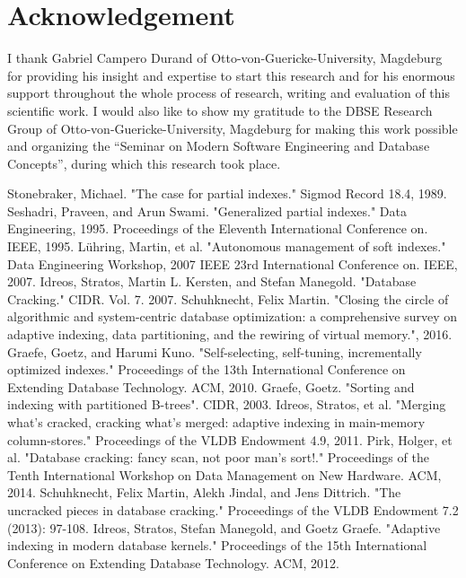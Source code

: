 \documentclass[10pt, conference, compsocconf]{IEEEtran}
\begin{document}
\section*{Acknowledgement}
I thank Gabriel Campero Durand of Otto-von-Guericke-University, Magdeburg for providing his insight and expertise to start this research and for his enormous support throughout the whole process of research, writing and evaluation of this scientific work. I would also like to show my gratitude to the DBSE Research Group of Otto-von-Guericke-University, Magdeburg for making this work possible and organizing the ``Seminar on Modern Software Engineering and Database Concepts'', during which this research took place.

\begin{thebibliography}{8}

Stonebraker, Michael. "The case for partial indexes." Sigmod Record 18.4, 1989.
Seshadri, Praveen, and Arun Swami. "Generalized partial indexes." Data Engineering, 1995. Proceedings of the Eleventh International Conference on. IEEE, 1995.
L\"uhring, Martin, et al. "Autonomous management of soft indexes." Data Engineering Workshop, 2007 IEEE 23rd International Conference on. IEEE, 2007.
Idreos, Stratos, Martin L. Kersten, and Stefan Manegold. "Database Cracking." CIDR. Vol. 7. 2007.
Schuhknecht, Felix Martin. "Closing the circle of algorithmic and system-centric database optimization: a comprehensive survey on adaptive indexing, data partitioning, and the rewiring of virtual memory.", 2016.
Graefe, Goetz, and Harumi Kuno. "Self-selecting, self-tuning, incrementally optimized indexes." Proceedings of the 13th International Conference on Extending Database Technology. ACM, 2010.
Graefe, Goetz. "Sorting and indexing with partitioned B-trees". CIDR, 2003.
Idreos, Stratos, et al. "Merging what's cracked, cracking what's merged: adaptive indexing in main-memory column-stores." Proceedings of the VLDB Endowment 4.9, 2011.
Pirk, Holger, et al. "Database cracking: fancy scan, not poor man's sort!." Proceedings of the Tenth International Workshop on Data Management on New Hardware. ACM, 2014.
Schuhknecht, Felix Martin, Alekh Jindal, and Jens Dittrich. "The uncracked pieces in database cracking." Proceedings of the VLDB Endowment 7.2 (2013): 97-108.
Idreos, Stratos, Stefan Manegold, and Goetz Graefe. "Adaptive indexing in modern database kernels." Proceedings of the 15th International Conference on Extending Database Technology. ACM, 2012.

\end{thebibliography}
\end{document}
